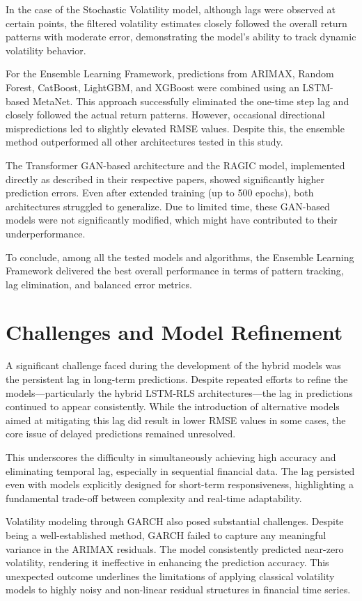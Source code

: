In the case of the Stochastic Volatility model, although lags were observed at certain points, the filtered volatility estimates closely followed the overall return patterns with moderate error, demonstrating the model's ability to track dynamic volatility behavior.

For the Ensemble Learning Framework, predictions from ARIMAX, Random Forest, CatBoost, LightGBM, and XGBoost were combined using an LSTM-based MetaNet. This approach successfully eliminated the one-time step lag and closely followed the actual return patterns. However, occasional directional mispredictions led to slightly elevated RMSE values. Despite this, the ensemble method outperformed all other architectures tested in this study.

The Transformer GAN-based architecture and the RAGIC model, implemented directly as described in their respective papers, showed significantly higher prediction errors. Even after extended training (up to 500 epochs), both architectures struggled to generalize. Due to limited time, these GAN-based models were not significantly modified, which might have contributed to their underperformance.

To conclude, among all the tested models and algorithms, the Ensemble Learning Framework delivered the best overall performance in terms of pattern tracking, lag elimination, and balanced error metrics.

\section{Challenges and Model Refinement}
A significant challenge faced during the development of the hybrid models was the persistent lag in long-term predictions. Despite repeated efforts to refine the models—particularly the hybrid LSTM-RLS architectures—the lag in predictions continued to appear consistently. While the introduction of alternative models aimed at mitigating this lag did result in lower RMSE values in some cases, the core issue of delayed predictions remained unresolved.

This underscores the difficulty in simultaneously achieving high accuracy and eliminating temporal lag, especially in sequential financial data. The lag persisted even with models explicitly designed for short-term responsiveness, highlighting a fundamental trade-off between complexity and real-time adaptability.

Volatility modeling through GARCH also posed substantial challenges. Despite being a well-established method, GARCH failed to capture any meaningful variance in the ARIMAX residuals. The model consistently predicted near-zero volatility, rendering it ineffective in enhancing the prediction accuracy. This unexpected outcome underlines the limitations of applying classical volatility models to highly noisy and non-linear residual structures in financial time series.

